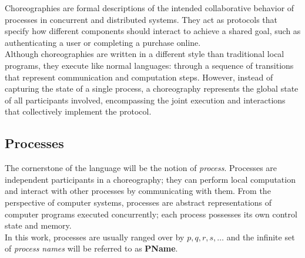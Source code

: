 \documentclass[12pt,a4paper,twoside]{book}
\begin{document}
Choreographies are formal descriptions of the intended collaborative behavior of processes in concurrent and distributed systems. They act as protocols that specify how different components should interact to achieve a shared goal, such as authenticating a user or completing a purchase online.\\
Although choreographies are written in a different style than traditional local programs, they execute like normal languages: through a sequence of transitions that represent communication and computation steps. However, instead of capturing the state of a single process, a choreography represents the global state of all participants involved, encompassing the joint execution and interactions that collectively implement the protocol.


\subsection{Processes}
The cornerstone of the language will be the notion of \textit{process}. Processes are independent participants in a choreography; they can perform local computation and interact with other processes by communicating with them. From the perspective of computer systems, processes are abstract representations of computer programs executed concurrently; each process possesses its own control state and memory.\\
In this work, processes are usually ranged over by $p, q, r, s, \ldots$ and the infinite set of \textit{process names} will be referred to as \textbf{PName}.
\end{document}
